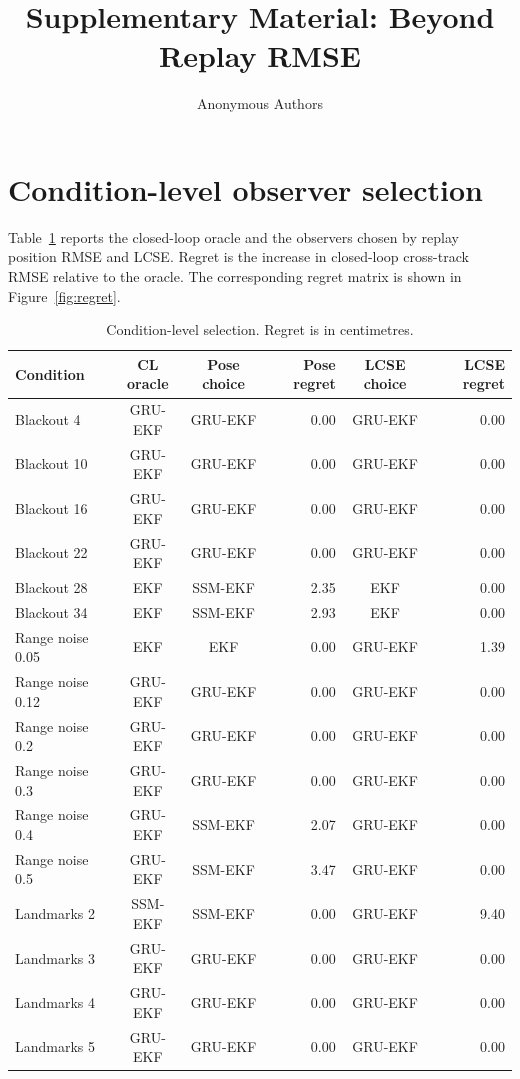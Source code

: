 \documentclass{article}
\title{Supplementary Material: Beyond Replay RMSE}
\author{Anonymous Authors}
\begin{document}
\maketitle

\section{Condition-level observer selection}
Table~\ref{tab:conditions} reports the closed-loop oracle and the observers chosen by replay position RMSE and LCSE. Regret is the increase in closed-loop cross-track RMSE relative to the oracle. The corresponding regret matrix is shown in Figure~\ref{fig:regret}.

\begin{table}[h]
\centering
\caption{Condition-level selection. Regret is in centimetres.}
\label{tab:conditions}
\scriptsize
\begin{tabular}{lccrcr}
\toprule
Condition & CL oracle & Pose choice & Pose regret & LCSE choice & LCSE regret\\
\midrule
Blackout 4 & GRU-EKF & GRU-EKF & 0.00 & GRU-EKF & 0.00 \\
Blackout 10 & GRU-EKF & GRU-EKF & 0.00 & GRU-EKF & 0.00 \\
Blackout 16 & GRU-EKF & GRU-EKF & 0.00 & GRU-EKF & 0.00 \\
Blackout 22 & GRU-EKF & GRU-EKF & 0.00 & GRU-EKF & 0.00 \\
Blackout 28 & EKF & SSM-EKF & 2.35 & EKF & 0.00 \\
Blackout 34 & EKF & SSM-EKF & 2.93 & EKF & 0.00 \\
Range noise 0.05 & EKF & EKF & 0.00 & GRU-EKF & 1.39 \\
Range noise 0.12 & GRU-EKF & GRU-EKF & 0.00 & GRU-EKF & 0.00 \\
Range noise 0.2 & GRU-EKF & GRU-EKF & 0.00 & GRU-EKF & 0.00 \\
Range noise 0.3 & GRU-EKF & GRU-EKF & 0.00 & GRU-EKF & 0.00 \\
Range noise 0.4 & GRU-EKF & SSM-EKF & 2.07 & GRU-EKF & 0.00 \\
Range noise 0.5 & GRU-EKF & SSM-EKF & 3.47 & GRU-EKF & 0.00 \\
Landmarks 2 & SSM-EKF & SSM-EKF & 0.00 & GRU-EKF & 9.40 \\
Landmarks 3 & GRU-EKF & GRU-EKF & 0.00 & GRU-EKF & 0.00 \\
Landmarks 4 & GRU-EKF & GRU-EKF & 0.00 & GRU-EKF & 0.00 \\
Landmarks 5 & GRU-EKF & GRU-EKF & 0.00 & GRU-EKF & 0.00 \\

\end{tabular}
\end{table}
\end{document}

